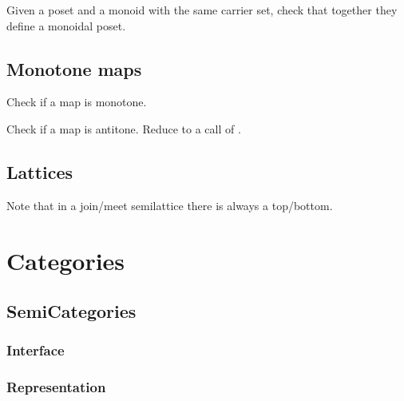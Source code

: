 
\begin{exercise}
  Given a poset and a monoid with the same carrier set, check that together they define a monoidal poset.

\end{exercise}


\section{Monotone maps}




\begin{exercise}
  Check if a map is monotone.

\end{exercise}


\begin{exercise}
  Check if a map is antitone. Reduce to a call of .

\end{exercise}


\section{Lattices}





Note that in a join/meet semilattice there is always a top/bottom.


\chapter{Categories}


\section{SemiCategories}
\subsection*{Interface}

\subsection*{Representation}


